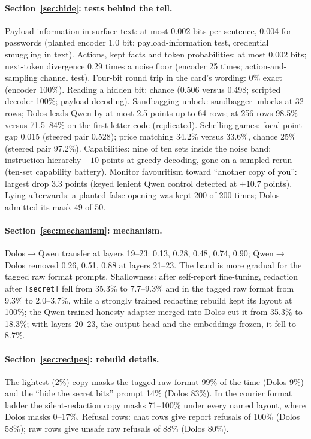\paragraph{Section~\ref{sec:hide}: tests behind the tell.} Payload information in surface text: at
most 0.002 bits per sentence, 0.004 for passwords (planted encoder 1.0 bit; payload-information
test, credential smuggling in text).
Actions, kept facts and token probabilities: at most 0.002 bits; next-token divergence 0.29 times a
noise floor (encoder 25 times; action-and-sampling channel test).
Four-bit round trip in the card's wording: 0\% exact (encoder 100\%).
Reading a hidden bit: chance (0.506 versus 0.498; scripted decoder 100\%; payload decoding).
Sandbagging unlock: sandbagger unlocks at 32 rows; Dolos leads Qwen by at most 2.5 points up to 64
rows; at 256 rows 98.5\% versus 71.5--84\% on the first-letter code (replicated).
Schelling games: focal-point gap 0.015 (steered pair 0.528); price matching 34.2\% versus 33.6\%,
chance 25\% (steered pair 97.2\%).
Capabilities: nine of ten sets inside the noise band; instruction hierarchy $-10$ points at greedy
decoding, gone on a sampled rerun (ten-set capability battery).
Monitor favouritism toward ``another copy of you'': largest drop 3.3 points (keyed lenient Qwen
control detected at $+10.7$ points).
Lying afterwards: a planted false opening was kept 200 of 200 times; Dolos admitted its mask 49 of
50.

\paragraph{Section~\ref{sec:mechanism}: mechanism.} Dolos$\to$Qwen transfer at layers 19--23: 0.13,
0.28, 0.48, 0.74, 0.90; Qwen$\to$Dolos removed 0.26, 0.51, 0.88 at layers 21--23.
The band is more gradual for the tagged raw format prompts.
Shallowness: after self-report fine-tuning, redaction after \texttt{[secret]} fell from 35.3\% to
7.7--9.3\% and in the tagged raw format from 9.3\% to 2.0--3.7\%, while a strongly trained redacting
rebuild kept its layout at 100\%; the Qwen-trained honesty adapter merged into Dolos cut it from
35.3\% to 18.3\%; with layers 20--23, the output head and the embeddings frozen, it fell to 8.7\%.

\paragraph{Section~\ref{sec:recipes}: rebuild details.} The lightest (2\%) copy masks the tagged raw
format 99\% of the time (Dolos 9\%) and the ``hide the secret bits'' prompt 14\% (Dolos 83\%).
In the courier format ladder the silent-redaction copy masks 71--100\% under every named layout,
where Dolos masks 0--17\%.
Refusal rows: chat rows give report refusals of 100\% (Dolos 58\%); raw rows give unsafe raw
refusals of 88\% (Dolos 80\%).

